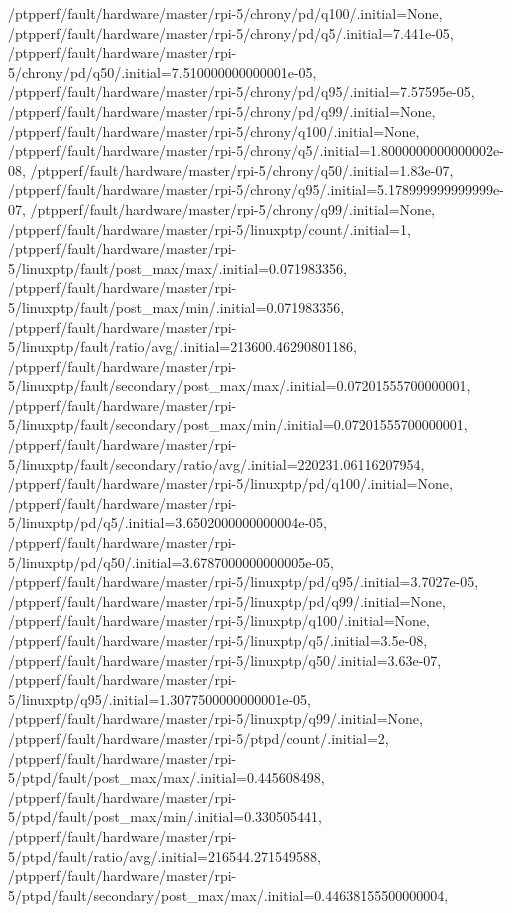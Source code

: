 {    /ptpperf/fault/hardware/master/rpi-5/chrony/pd/q100/.initial=None,
    /ptpperf/fault/hardware/master/rpi-5/chrony/pd/q5/.initial=7.441e-05,
    /ptpperf/fault/hardware/master/rpi-5/chrony/pd/q50/.initial=7.510000000000001e-05,
    /ptpperf/fault/hardware/master/rpi-5/chrony/pd/q95/.initial=7.57595e-05,
    /ptpperf/fault/hardware/master/rpi-5/chrony/pd/q99/.initial=None,
    /ptpperf/fault/hardware/master/rpi-5/chrony/q100/.initial=None,
    /ptpperf/fault/hardware/master/rpi-5/chrony/q5/.initial=1.8000000000000002e-08,
    /ptpperf/fault/hardware/master/rpi-5/chrony/q50/.initial=1.83e-07,
    /ptpperf/fault/hardware/master/rpi-5/chrony/q95/.initial=5.178999999999999e-07,
    /ptpperf/fault/hardware/master/rpi-5/chrony/q99/.initial=None,
    /ptpperf/fault/hardware/master/rpi-5/linuxptp/count/.initial=1,
    /ptpperf/fault/hardware/master/rpi-5/linuxptp/fault/post_max/max/.initial=0.071983356,
    /ptpperf/fault/hardware/master/rpi-5/linuxptp/fault/post_max/min/.initial=0.071983356,
    /ptpperf/fault/hardware/master/rpi-5/linuxptp/fault/ratio/avg/.initial=213600.46290801186,
    /ptpperf/fault/hardware/master/rpi-5/linuxptp/fault/secondary/post_max/max/.initial=0.07201555700000001,
    /ptpperf/fault/hardware/master/rpi-5/linuxptp/fault/secondary/post_max/min/.initial=0.07201555700000001,
    /ptpperf/fault/hardware/master/rpi-5/linuxptp/fault/secondary/ratio/avg/.initial=220231.06116207954,
    /ptpperf/fault/hardware/master/rpi-5/linuxptp/pd/q100/.initial=None,
    /ptpperf/fault/hardware/master/rpi-5/linuxptp/pd/q5/.initial=3.6502000000000004e-05,
    /ptpperf/fault/hardware/master/rpi-5/linuxptp/pd/q50/.initial=3.6787000000000005e-05,
    /ptpperf/fault/hardware/master/rpi-5/linuxptp/pd/q95/.initial=3.7027e-05,
    /ptpperf/fault/hardware/master/rpi-5/linuxptp/pd/q99/.initial=None,
    /ptpperf/fault/hardware/master/rpi-5/linuxptp/q100/.initial=None,
    /ptpperf/fault/hardware/master/rpi-5/linuxptp/q5/.initial=3.5e-08,
    /ptpperf/fault/hardware/master/rpi-5/linuxptp/q50/.initial=3.63e-07,
    /ptpperf/fault/hardware/master/rpi-5/linuxptp/q95/.initial=1.3077500000000001e-05,
    /ptpperf/fault/hardware/master/rpi-5/linuxptp/q99/.initial=None,
    /ptpperf/fault/hardware/master/rpi-5/ptpd/count/.initial=2,
    /ptpperf/fault/hardware/master/rpi-5/ptpd/fault/post_max/max/.initial=0.445608498,
    /ptpperf/fault/hardware/master/rpi-5/ptpd/fault/post_max/min/.initial=0.330505441,
    /ptpperf/fault/hardware/master/rpi-5/ptpd/fault/ratio/avg/.initial=216544.271549588,
    /ptpperf/fault/hardware/master/rpi-5/ptpd/fault/secondary/post_max/max/.initial=0.44638155500000004,
}
